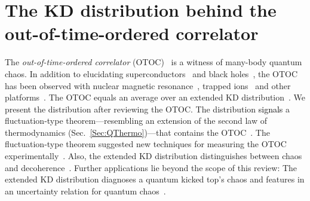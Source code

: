 \documentclass[%
 reprint,
superscriptaddress,
nofootinbib,
bibnotes,
 amsmath,amssymb,
 aps,
]{revtex4-1}
\theoremstyle{plain}
\newcommand{\Dave}[1]{\textcolor{black}{#1} }
\begin{document}
\section{The KD distribution behind the out-of-time-ordered correlator}
\label{Sec:OTOC}

The \textit{out-of-time-ordered correlator} (OTOC)~\cite{NYH_jarzynski_2017} is
a witness of many-body quantum chaos.
In addition to elucidating superconductors~\cite{Larkin_quasiclassical_1969}  and black holes~\cite{Shenker_Black_2014, Maldacena_Diving_2017, Yoshida_Efficient_2017, Gao_Traversable_2017}, the OTOC has been observed with nuclear magnetic resonance~\cite{Li_measuring_2017, Wei_exploring_2018, Nie_experimental_2020, Niknam_sensitivity_2020}, trapped ions~\cite{Britton_engineered_2012, Islam_emergence_2013, Garttner_measuring_2017,Landsman_verified_2019, Joshi_quantum_2020} and other platforms~\cite{Yan_observation_2013, Choi_observation_2017,Foxen_demonstrating_2020, Chen_detecting_2020, Pegahan_energy_2021, Blok_quantum_2021, Garcia_quantum_2021, Braumuller_probing_2022, Mi_information_2021, Geller_quantum_2022, Harris_benchmarking_2022, Blocher_measuring_2022, Wang_information_2022, Green_experimental_2022}.
The OTOC equals an average over an extended KD distribution~\cite{NYH_jarzynski_2017, NYH_quasiprobability_2018}.
We present the distribution after reviewing the OTOC.
The distribution 
\Dave{signals} a fluctuation-type theorem---resembling an extension of the second law of thermodynamics (Sec.~\ref{Sec:QThermo})---that contains the OTOC~\cite{NYH_jarzynski_2017}.
The fluctuation-type theorem suggested new techniques for measuring the OTOC experimentally~\cite{NYH_jarzynski_2017, NYH_quasiprobability_2018, Dressel_strengthening_2018, Mohseninia_optimizing_2019}.
Also, the extended KD distribution distinguishes between chaos and decoherence~\cite{Alonso_OTOC_2019}.
Further applications lie beyond the scope of this review: The extended KD distribution diagnoses 
a quantum kicked top's chaos
\cite{Alonso_diagnosing_2022} and features in an uncertainty relation for quantum chaos~\cite{Yunger_Halpern_entropic-2019}.
\end{document}
